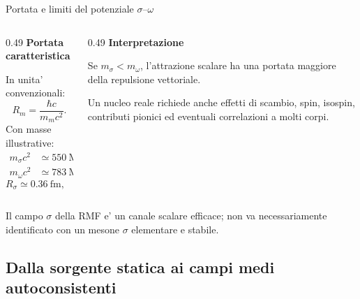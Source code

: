 \begin{frame}{Portata e limiti del potenziale $\sigma$--$\omega$}
\small
\begin{columns}[T,onlytextwidth]
\begin{column}{0.49\textwidth}
\textbf{Portata caratteristica}\par\smallskip
In unita' convenzionali:
\[
R_m=\frac{\hbar c}{m_mc^2}.
\]
Con masse illustrative:
\[
\begin{aligned}
m_\sigma c^2&\simeq550\ \mathrm{MeV},\\
m_\omega c^2&\simeq783\ \mathrm{MeV},
\end{aligned}
\]
\[
R_\sigma\simeq0.36\ \mathrm{fm},\quad
R_\omega\simeq0.25\ \mathrm{fm}.
\]
\end{column}
\begin{column}{0.49\textwidth}
\textbf{Interpretazione}\par\smallskip
Se \(m_\sigma<m_\omega\), l'attrazione scalare
ha una portata maggiore della repulsione vettoriale.\par\smallskip
Un nucleo reale richiede anche effetti di
scambio, spin, isospin, contributi pionici
ed eventuali correlazioni a molti corpi.
\end{column}
\end{columns}
\medskip
Il campo \(\sigma\) della RMF e' un canale scalare efficace;
non va necessariamente identificato con un mesone \(\sigma\)
elementare e stabile.
\end{frame}

\subsection{Dalla sorgente statica ai campi medi autoconsistenti}

